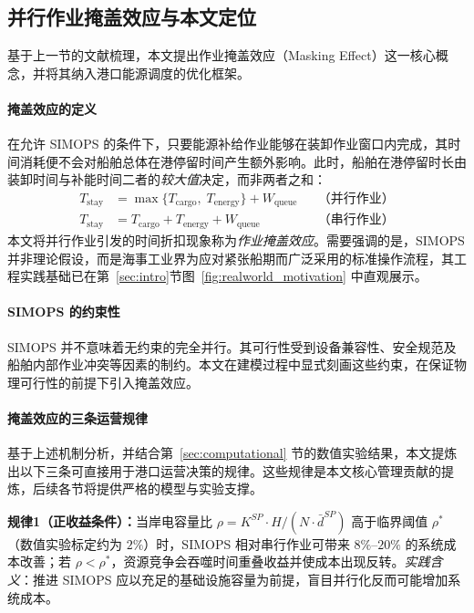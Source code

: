 \documentclass[UTF8, a4paper, 12pt]{ctexart}
\theoremstyle{plain}
\theoremstyle{definition}
\theoremstyle{remark}
\begin{document}
\subsection{并行作业掩盖效应与本文定位}
 
基于上一节的文献梳理，本文提出作业掩盖效应（Masking Effect）这一核心概念，并将其纳入港口能源调度的优化框架。
 
\paragraph{掩盖效应的定义}
在允许 SIMOPS 的条件下，只要能源补给作业能够在装卸作业窗口内完成，其时间消耗便不会对船舶总体在港停留时间产生额外影响。此时，船舶在港停留时长由装卸时间与补能时间二者的\emph{较大值}决定，而非两者之和：
\begin{equation*}
\begin{aligned}
T_{\text{stay}} &= \max\{T_{\text{cargo}},\; T_{\text{energy}}\} + W_{\text{queue}}
&& \text{（并行作业）} \\
T_{\text{stay}} &= T_{\text{cargo}} + T_{\text{energy}} + W_{\text{queue}}
&& \text{（串行作业）}
\end{aligned}
\end{equation*}
本文将并行作业引发的时间折扣现象称为\emph{作业掩盖效应}。需要强调的是，SIMOPS 并非理论假设，而是海事工业界为应对紧张船期而广泛采用的标准操作流程，其工程实践基础已在第~\ref{sec:intro}节图~\ref{fig:realworld_motivation} 中直观展示。
 
\paragraph{SIMOPS 的约束性}
SIMOPS 并不意味着无约束的完全并行。其可行性受到设备兼容性、安全规范及船舶内部作业冲突等因素的制约。本文在建模过程中显式刻画这些约束，在保证物理可行性的前提下引入掩盖效应。

\paragraph{掩盖效应的三条运营规律}
基于上述机制分析，并结合第~\ref{sec:computational} 节的数值实验结果，本文提炼出以下三条可直接用于港口运营决策的规律。这些规律是本文核心管理贡献的提炼，后续各节将提供严格的模型与实验支撑。

\textbf{规律1（正收益条件）：}当岸电容量比 $\rho = K^{SP} \cdot H / (N \cdot \bar{d}^{SP})$ 高于临界阈值 $\rho^*$（数值实验标定约为 $2\%$）时，SIMOPS 相对串行作业可带来 $8\%$--$20\%$ 的系统成本改善；若 $\rho < \rho^*$，资源竞争会吞噬时间重叠收益并使成本出现反转。\emph{实践含义}：推进 SIMOPS 应以充足的基础设施容量为前提，盲目并行化反而可能增加系统成本。
\end{document}
